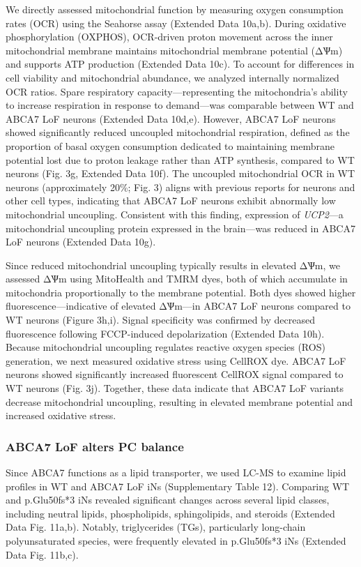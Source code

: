 We directly assessed mitochondrial function by measuring oxygen consumption rates (OCR) using the Seahorse assay (Extended Data 10a,b). During oxidative phosphorylation (OXPHOS), OCR-driven proton movement across the inner mitochondrial membrane maintains mitochondrial membrane potential (ΔѰm) and supports ATP production (Extended Data 10c). To account for differences in cell viability and mitochondrial abundance, we analyzed internally normalized OCR ratios. Spare respiratory capacity—representing the mitochondria's ability to increase respiration in response to demand—was comparable between WT and ABCA7 LoF neurons (Extended Data 10d,e). However, ABCA7 LoF neurons showed significantly reduced uncoupled mitochondrial respiration, defined as the proportion of basal oxygen consumption dedicated to maintaining membrane potential lost due to proton leakage rather than ATP synthesis\supercite{Divakaruni2022-bp}, compared to WT neurons (Fig. 3g, Extended Data 10f). The uncoupled mitochondrial OCR in WT neurons (approximately 20\%; Fig. 3) aligns with previous reports for neurons and other cell types\supercite{Divakaruni2011-uj,Jain2024-br}, indicating that ABCA7 LoF neurons exhibit abnormally low mitochondrial uncoupling. Consistent with this finding, expression of \textit{UCP2}—a mitochondrial uncoupling protein expressed in the brain\supercite{Kumar2022-bb}—was reduced in ABCA7 LoF neurons (Extended Data 10g).

Since reduced mitochondrial uncoupling typically results in elevated ΔѰm, we assessed ΔѰm using MitoHealth and TMRM dyes, both of which accumulate in mitochondria proportionally to the membrane potential. Both dyes showed higher fluorescence—indicative of elevated ΔѰm—in ABCA7 LoF neurons compared to WT neurons (Figure 3h,i). Signal specificity was confirmed by decreased fluorescence following FCCP-induced depolarization (Extended Data 10h). Because mitochondrial uncoupling regulates reactive oxygen species (ROS) generation, we next measured oxidative stress using CellROX dye. ABCA7 LoF neurons showed significantly increased fluorescent CellROX signal compared to WT neurons (Fig. 3j). Together, these data indicate that ABCA7 LoF variants decrease mitochondrial uncoupling, resulting in elevated membrane potential and increased oxidative stress.

\subsubsection{ABCA7 LoF alters PC balance}
Since ABCA7 functions as a lipid transporter, we used LC-MS to examine lipid profiles in WT and ABCA7 LoF iNs (Supplementary Table 12). Comparing WT and p.Glu50fs*3 iNs revealed significant changes across several lipid classes, including neutral lipids, phospholipids, sphingolipids, and steroids (Extended Data Fig. 11a,b). Notably, triglycerides (TGs), particularly long-chain polyunsaturated species, were frequently elevated in p.Glu50fs*3 iNs (Extended Data Fig. 11b,c).

